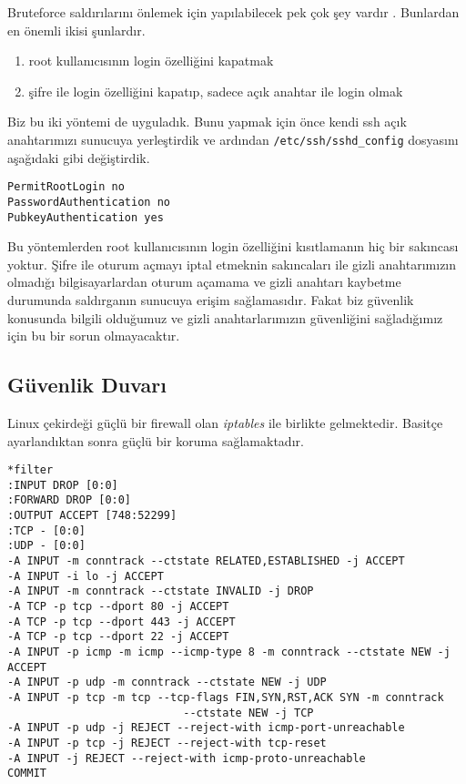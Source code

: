 \documentclass[11pt,a4paper]{report}
\begin{document}
Bruteforce saldırılarını önlemek için yapılabilecek pek çok şey vardır \cite{blog}. Bunlardan en önemli ikisi şunlardır.

\begin{enumerate}
\item root kullanıcısının login özelliğini kapatmak
\item şifre ile login özelliğini kapatıp, sadece açık anahtar ile login olmak
\end{enumerate}

Biz bu iki yöntemi de uyguladık. Bunu yapmak için önce kendi ssh açık anahtarımızı sunucuya yerleştirdik ve ardından \texttt{/etc/ssh/sshd\_config} dosyasını aşağıdaki gibi değiştirdik.

\begin{lstlisting}[caption=OpenSSH Ayarları]
PermitRootLogin no
PasswordAuthentication no
PubkeyAuthentication yes
\end{lstlisting}

Bu yöntemlerden root kullanıcısının login özelliğini kısıtlamanın hiç bir sakıncası yoktur. Şifre ile oturum açmayı iptal etmeknin sakıncaları ile gizli anahtarımızın olmadığı bilgisayarlardan oturum açamama ve gizli anahtarı kaybetme durumunda saldırganın sunucuya erişim sağlamasıdır. Fakat biz güvenlik konusunda bilgili olduğumuz ve gizli anahtarlarımızın güvenliğini sağladığımız için bu bir sorun olmayacaktır.

\subsection{Güvenlik Duvarı}

Linux çekirdeği güçlü bir firewall olan \emph{iptables} ile birlikte gelmektedir. Basitçe ayarlandıktan sonra güçlü bir koruma sağlamaktadır.

\begin{lstlisting}[caption=IPtables Ayarları,basicstyle=\footnotesize]
*filter
:INPUT DROP [0:0]
:FORWARD DROP [0:0]
:OUTPUT ACCEPT [748:52299]
:TCP - [0:0]
:UDP - [0:0]
-A INPUT -m conntrack --ctstate RELATED,ESTABLISHED -j ACCEPT
-A INPUT -i lo -j ACCEPT
-A INPUT -m conntrack --ctstate INVALID -j DROP
-A TCP -p tcp --dport 80 -j ACCEPT
-A TCP -p tcp --dport 443 -j ACCEPT
-A TCP -p tcp --dport 22 -j ACCEPT
-A INPUT -p icmp -m icmp --icmp-type 8 -m conntrack --ctstate NEW -j ACCEPT
-A INPUT -p udp -m conntrack --ctstate NEW -j UDP
-A INPUT -p tcp -m tcp --tcp-flags FIN,SYN,RST,ACK SYN -m conntrack
                           --ctstate NEW -j TCP
-A INPUT -p udp -j REJECT --reject-with icmp-port-unreachable
-A INPUT -p tcp -j REJECT --reject-with tcp-reset
-A INPUT -j REJECT --reject-with icmp-proto-unreachable
COMMIT
\end{lstlisting}
\end{document}
